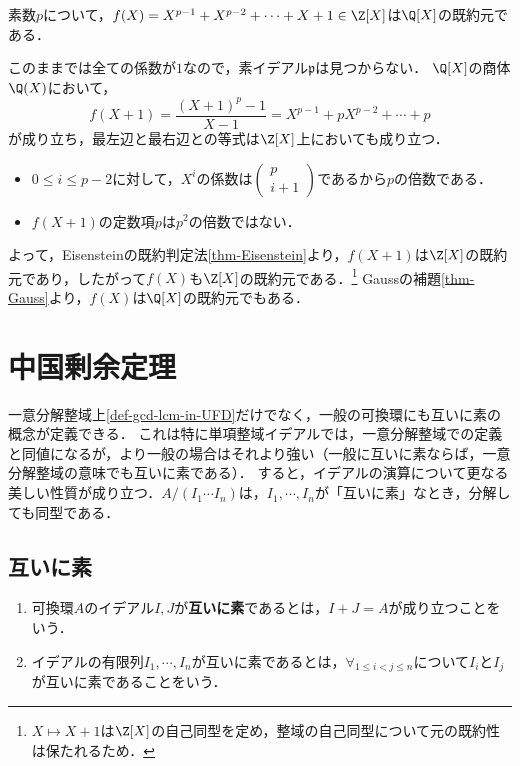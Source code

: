 \documentclass[uplatex,dvipdfmx]{jsreport}
\renewcommand{\p}{\mathfrak{p}}
\begin{document}
\begin{example}[既約多項式]\label{exp-Eisenstein}
    素数$p$について，$f(X)=X^{p-1}+X^{p-2}+\cdots+X+1\in\Z[X]$は$\Q[X]$の既約元である．

    このままでは全ての係数が$1$なので，素イデアル$\p$は見つからない．
    $\Q[X]$の商体$\Q(X)$において，
    \[f(X+1)=\frac{(X+1)^p-1}{X-1}=X^{p-1}+pX^{p-2}+\cdots+p\]
    が成り立ち，最左辺と最右辺との等式は$\Z[X]$上においても成り立つ．
    \begin{itemize}
        \item $0\le i\le p-2$に対して，$X^i$の係数は$\begin{pmatrix}p\\i+1\end{pmatrix}$であるから$p$の倍数である．
        \item $f(X+1)$の定数項$p$は$p^2$の倍数ではない．
    \end{itemize}
    よって，Eisensteinの既約判定法\ref{thm-Eisenstein}より，$f(X+1)$は$\Z[X]$の既約元であり，したがって$f(X)$も$\Z[X]$の既約元である．\footnote{$X\mapsto X+1$は$\Z[X]$の自己同型を定め，整域の自己同型について元の既約性は保たれるため．}
    Gaussの補題\ref{thm-Gauss}より，$f(X)$は$\Q[X]$の既約元でもある．
\end{example}

\section{中国剰余定理}

\begin{tcolorbox}[colframe=ForestGreen, colback=ForestGreen!10!white,breakable,colbacktitle=ForestGreen!40!white,coltitle=black,fonttitle=\bfseries\sffamily,
title=可換環の剰余環の形は，剰余を互いに素なイデアルについて分解すれば決定できる]
    一意分解整域上\ref{def-gcd-lcm-in-UFD}だけでなく，一般の可換環にも互いに素の概念が定義できる．
    これは特に単項整域イデアルでは，一意分解整域での定義と同値になるが，より一般の場合はそれより強い（一般に互いに素ならば，一意分解整域の意味でも互いに素である）．
    すると，イデアルの演算について更なる美しい性質が成り立つ．$A/(I_1\cdots I_n)$は，$I_1,\cdots,I_n$が「互いに素」なとき，分解しても同型である．
\end{tcolorbox}

\subsection{互いに素}

\begin{definition}[coprime]\mbox{}
    \begin{enumerate}
        \item 可換環$A$のイデアル$I,J$が\textbf{互いに素}であるとは，$I+J=A$が成り立つことをいう．
        \item イデアルの有限列$I_1,\cdots,I_n$が互いに素であるとは，$\forall_{1\le i<j\le n}$について$I_i$と$I_j$が互いに素であることをいう．
    \end{enumerate}
\end{definition}
\end{document}
